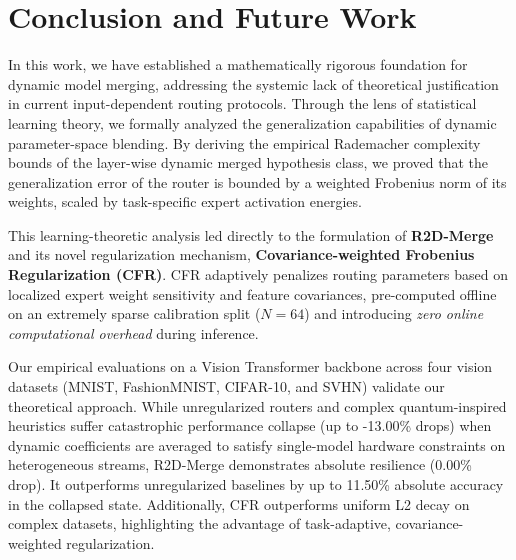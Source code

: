\section{Conclusion and Future Work}
\label{submission:conclusion}

In this work, we have established a mathematically rigorous foundation for dynamic model merging, addressing the systemic lack of theoretical justification in current input-dependent routing protocols. 
Through the lens of statistical learning theory, we formally analyzed the generalization capabilities of dynamic parameter-space blending. 
By deriving the empirical Rademacher complexity bounds of the layer-wise dynamic merged hypothesis class, we proved that the generalization error of the router is bounded by a weighted Frobenius norm of its weights, scaled by task-specific expert activation energies.

This learning-theoretic analysis led directly to the formulation of \textbf{R2D-Merge} and its novel regularization mechanism, \textbf{Covariance-weighted Frobenius Regularization (CFR)}. 
CFR adaptively penalizes routing parameters based on localized expert weight sensitivity and feature covariances, pre-computed offline on an extremely sparse calibration split ($N=64$) and introducing \emph{zero online computational overhead} during inference. 

Our empirical evaluations on a Vision Transformer backbone across four vision datasets (MNIST, FashionMNIST, CIFAR-10, and SVHN) validate our theoretical approach. 
While unregularized routers and complex quantum-inspired heuristics suffer catastrophic performance collapse (up to -13.00\% drops) when dynamic coefficients are averaged to satisfy single-model hardware constraints on heterogeneous streams, R2D-Merge demonstrates absolute resilience (0.00\% drop). It outperforms unregularized baselines by up to 11.50\% absolute accuracy in the collapsed state. 
Additionally, CFR outperforms uniform L2 decay on complex datasets, highlighting the advantage of task-adaptive, covariance-weighted regularization.

